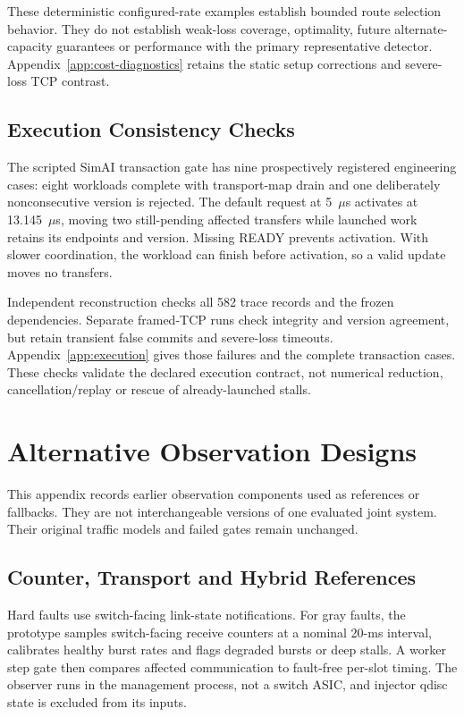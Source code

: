 \documentclass[sigconf]{acmart}
\begin{document}
These deterministic configured-rate examples establish bounded route
selection behavior. They do not establish weak-loss coverage, optimality,
future alternate-capacity guarantees or performance with the primary
representative detector. Appendix~\ref{app:cost-diagnostics} retains the
static setup corrections and severe-loss TCP contrast.

\subsection{Execution Consistency Checks}
\label{sec:execution-results}
The scripted SimAI transaction gate has nine prospectively registered
engineering cases: eight workloads complete with transport-map drain and
one deliberately nonconsecutive version is rejected. The default request
at 5~$\mu$s activates at 13.145~$\mu$s, moving two still-pending affected
transfers while launched work retains its endpoints and version. Missing
READY prevents activation. With slower coordination, the workload can
finish before activation, so a valid update moves no transfers.

Independent reconstruction checks all 582 trace records and the frozen
dependencies. Separate framed-TCP runs check integrity and version
agreement, but retain transient false commits and severe-loss timeouts.
Appendix~\ref{app:execution} gives those failures and the complete transaction
cases. These checks validate the declared execution contract, not numerical
reduction, cancellation/replay or rescue of already-launched stalls.


\section{Alternative Observation Designs}
\label{app:observers}
This appendix records earlier observation components used as references or
fallbacks. They are not interchangeable versions of one evaluated joint
system. Their original traffic models and failed gates remain unchanged.

\subsection{Counter, Transport and Hybrid References}
Hard faults use switch-facing link-state notifications. For gray faults,
the prototype samples switch-facing receive counters at a nominal 20-ms
interval, calibrates healthy burst rates and flags degraded bursts or
deep stalls. A worker step gate then compares affected communication to
fault-free per-slot timing. The observer runs in the management process,
not a switch ASIC, and injector qdisc state is excluded from its inputs.
\end{document}
